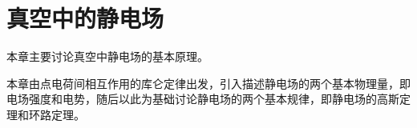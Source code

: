 \chapter{真空中的静电场}
本章主要讨论真空中静电场的基本原理。

本章由点电荷间相互作用的库仑定律出发，引入描述静电场的两个基本物理量，即电场强度和电势，随后以此为基础讨论静电场的两个基本规律，即静电场的高斯定理和环路定理。





